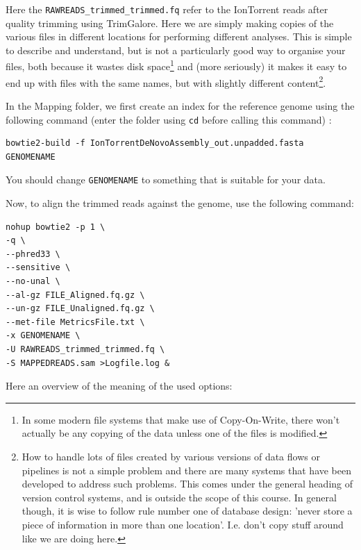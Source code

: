 \documentclass[11pt]{article}
\begin{document}
Here the \texttt{RAWREADS\_trimmed\_trimmed.fq} refer to the IonTorrent reads after
quality trimming using TrimGalore. Here we are simply making copies of the
various files in different locations for performing different analyses. This is simple to describe and
understand, but is not a particularly good way to organise your files, both
because it wastes disk space\footnote{In some modern file systems that make use of Copy-On-Write,
there won't actually be any copying of the data unless one of the
files is modified.} and (more seriously) it makes it
easy to end up with files with the same names, but with slightly different
content\footnote{How to handle lots of files created by various versions of
data flows or pipelines is not a simple problem and there are many
systems that have been developed to address such problems. This comes
under the general heading of version control systems, and is outside
the scope of this course. In general though, it is wise to follow rule
number one of database design: 'never store a piece of information in
more than one location'. I.e. don't copy stuff around like we are
doing here.}.

In the Mapping folder, we first create an index for the reference genome using the
following command (enter the folder using \texttt{cd} before calling this command) :

\begin{verbatim}
bowtie2-build -f IonTorrentDeNovoAssembly_out.unpadded.fasta GENOMENAME
\end{verbatim}

You should change \texttt{GENOMENAME} to something that is suitable for your data.

Now, to align the trimmed reads against the genome, use the following command:

\begin{verbatim}
nohup bowtie2 -p 1 \
-q \
--phred33 \
--sensitive \
--no-unal \
--al-gz FILE_Aligned.fq.gz \
--un-gz FILE_Unaligned.fq.gz \
--met-file MetricsFile.txt \
-x GENOMENAME \
-U RAWREADS_trimmed_trimmed.fq \
-S MAPPEDREADS.sam >Logfile.log &
\end{verbatim}

Here an overview of the meaning of the used options:
\end{document}
